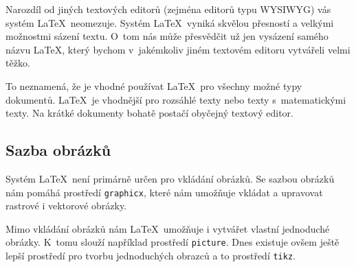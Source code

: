 \documentclass[a4paper, 11pt]{article}
\begin{document}
{  Narozdíl od jiných textových editorů (zejména editorů typu WYSIWYG) vás systém \LaTeX ~neomezuje. Systém \LaTeX ~vyniká skvělou přesností a velkými možnostmi sázení textu. O~tom nás může přesvědčit už jen vysázení samého názvu \LaTeX , který bychom v~jakémkoliv jiném textovém editoru vytvářeli velmi těžko. \cite{mar}

  To neznamená, že je vhodné používat \LaTeX ~pro všechny možné typy dokumentů. \LaTeX ~je vhodnější pro rozsáhlé texty nebo texty s~matematickými texty. Na krátké dokumenty bohatě postačí obyčejný textový editor. \cite{ves}

  \subsection{Sazba obrázků}

  Systém \LaTeX ~není primárně určen pro vkládání obrázků. Se sazbou obrázků nám pomáhá prostředí \verb|graphicx|, které nám umožňuje vkládat a upravovat rastrové i vektorové obrázky. \cite{sat,sva}

  Mimo vkládání obrázků nám \LaTeX ~umožňuje i vytvářet vlastní jednoduché obrázky. K~tomu slouží například prostředí \verb|picture|. Dnes existuje ovšem ještě lepší prostředí pro tvorbu jednoduchých obrazců a to prostředí \verb|tikz|. \cite{wri}

  \newpage
  
  \renewcommand{\refname}{Použité zdroje}
  

}
\end{document}
